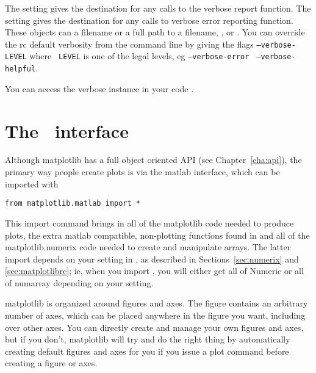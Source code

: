 \documentclass[twoside]{book}
\begin{document}
The  setting gives the destination for any calls to
the verbose report function.  The  setting gives the
destination for any calls to verbose error reporting function.  These
objects can a filename or a full path to a filename, ,
or .  You can override the rc default verbosity from
the command line by giving the flags {\tt--verbose-LEVEL} where {\tt
  LEVEL} is one of the legal levels, eg {\tt --verbose-error} {\tt
  --verbose-helpful}.

You can access the verbose instance in your code 
.


\chapter{The \matlab\ interface}
\label{cha:matlab_interface}

Although matplotlib has a full object oriented API (see
Chapter~\ref{cha:api}), the primary way people create plots is via the
matlab interface, which can be imported with

\begin{lstlisting}
from matplotlib.matlab import *
\end{lstlisting}

\noindent This import command brings in all of the matplotlib code
needed to produce plots, the extra matlab compatible, non-plotting
functions found in  and all of the
matplotlib.numerix code needed to create and manipulate arrays.  The
latter import depends on your  setting in
, as described in Sections~\ref{sec:numerix} and
\ref{sec:matplotlibrc}; ie, when you import
, you will either get all of Numeric or all
of numarray depending on your  setting.

matplotlib is organized around figures and axes.  The figure contains
an arbitrary number of axes, which can be placed anywhere in the
figure you want, including over other axes.  You can directly create
and manage your own figures and axes, but if you don't, matplotlib
will try and do the right thing by automatically creating default
figures and axes for you if you issue a plot command before creating a
figure or axes. 
\end{document}
